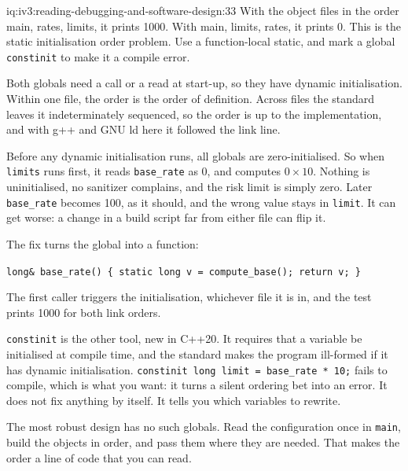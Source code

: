 \begin{solution}{iq:iv3:reading-debugging-and-software-design:33}
With the object files in the order main, rates, limits, it prints 1000. With main, limits, rates, it prints 0. This is the static initialisation order problem. Use a function-local static, and mark a global \texttt{constinit} to make it a compile error.

Both globals need a call or a read at start-up, so they have dynamic initialisation. Within one file, the order is the order of definition. Across files the standard leaves it indeterminately sequenced, so the order is up to the implementation, and with g++ and GNU ld here it followed the link line.

Before any dynamic initialisation runs, all globals are zero-initialised. So when \texttt{limits} runs first, it reads \texttt{base\_rate} as 0, and computes $0 \times 10$. Nothing is uninitialised, no sanitizer complains, and the risk limit is simply zero. Later \texttt{base\_rate} becomes 100, as it should, and the wrong value stays in \texttt{limit}. It can get worse: a change in a build script far from either file can flip it.

The fix turns the global into a function:

\texttt{long\& base\_rate() \{ static long v = compute\_base(); return v; \}}

The first caller triggers the initialisation, whichever file it is in, and the test prints 1000 for both link orders.

\texttt{constinit} is the other tool, new in C++20. It requires that a variable be initialised at compile time, and the standard makes the program ill-formed if it has dynamic initialisation. \texttt{constinit long limit = base\_rate * 10;} fails to compile, which is what you want: it turns a silent ordering bet into an error. It does not fix anything by itself. It tells you which variables to rewrite.

The most robust design has no such globals. Read the configuration once in \texttt{main}, build the objects in order, and pass them where they are needed. That makes the order a line of code that you can read.



\end{solution}

